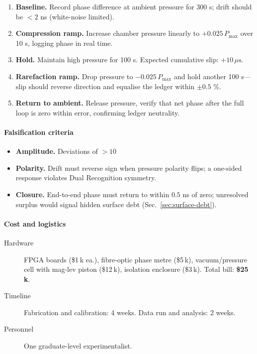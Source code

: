 \documentclass[11pt,oneside]{book}
\begin{document}
\begin{enumerate}
\item \textbf{Baseline.}  Record phase difference at ambient pressure for 300 s; drift should be $<2$ ns (white-noise limited).

\item \textbf{Compression ramp.}  Increase chamber pressure linearly to $+0.025\,P_{\max}$ over 10 s, logging phase in real time.

\item \textbf{Hold.}  Maintain high pressure for 100 s.  Expected cumulative slip: $+10\,\mu\text{s}$.

\item \textbf{Rarefaction ramp.}  Drop pressure to $-0.025\,P_{\max}$ and hold another 100 s—slip should reverse direction and equalise the ledger within $\pm0.5$ \%.

\item \textbf{Return to ambient.}  Release pressure, verify that net phase after the full loop is zero within error, confirming ledger neutrality.
\end{enumerate}

\paragraph*{Falsification criteria}

\begin{itemize}
\item \textbf{Amplitude.}  Deviations of $>10$ %
\item \textbf{Polarity.}  Drift must reverse sign when pressure polarity flips; a one-sided response violates Dual Recognition symmetry.
\item \textbf{Closure.}  End-to-end phase must return to within $0.5$ ns of zero; unresolved surplus would signal hidden surface debt (Sec.~\ref{sec:surface-debt}).
\end{itemize}

\paragraph*{Cost and logistics}

\begin{description}
\item[Hardware] FPGA boards (\$1 k ea.), fibre-optic phase metre (\$5 k), vacuum/pressure cell with mag-lev piston (\$12 k), isolation enclosure (\$3 k).  Total bill: \textbf{\$25 k}.
\item[Timeline] Fabrication and calibration: 4 weeks.  Data run and analysis: 2 weeks.
\item[Personnel] One graduate-level experimentalist.
\end{description}
\end{document}
